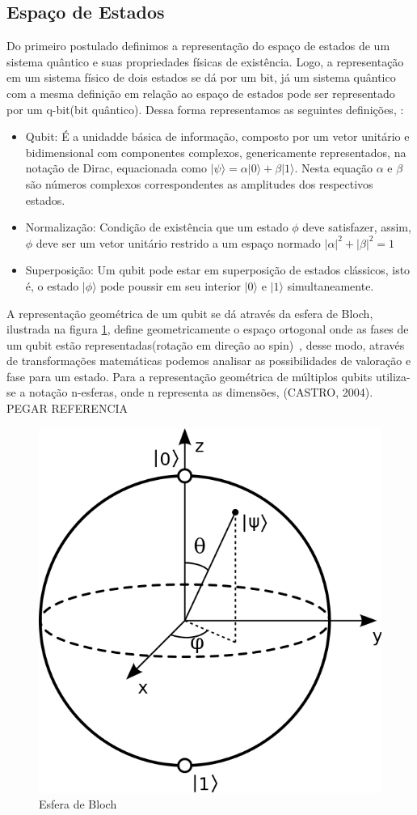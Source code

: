 \documentclass[tcc,capa]{texufpel}
\begin{document}
\subsection{Espaço de Estados}
Do primeiro postulado definimos a representação do espaço de estados de um sistema quântico e suas propriedades físicas de existência. Logo, a representação em um sistema físico de dois estados se dá por um bit, já um sistema quântico com a mesma definição em relação ao espaço de estados pode ser representado por um q-bit(bit quântico).  Dessa forma representamos as seguintes definições\cite{maron:2013:ccgrid}, \cite{Schmalfuss14}:
\begin{itemize}
    \item Qubit: É a unidadde básica de informação, composto por um vetor unitário e bidimensional com componentes complexos, genericamente representados, na notação de Dirac, equacionada como $|\psi\rangle= \alpha|0\rangle + \beta|1\rangle$. Nesta equação $\alpha$ e $\beta$ são números complexos correspondentes as amplitudes dos respectivos estados.
    \item Normalização: Condição de existência que um estado $\phi$ deve satisfazer, assim, $\phi$ deve ser um vetor unitário restrido a um espaço normado $|\alpha|^2 + |\beta|^2=1$ 
    \item Superposição: Um qubit pode estar em superposição de estados clássicos, isto é, o estado $|\phi\rangle$ pode poussir em seu interior $|0\rangle$ e $|1\rangle$ simultaneamente. 
\end{itemize}

A representação geométrica de um qubit se dá através da esfera de Bloch, ilustrada na figura \ref{fig:Bloch}, define geometricamente o espaço ortogonal onde as fases de um qubit estão representadas(rotação em direção ao spin)~\cite{chuang00a}, desse modo, através de transformações matemáticas podemos analisar as possibilidades de valoração e fase para um estado. Para a representação geométrica de múltiplos qubits utiliza-se a notação n-esferas, onde n representa as dimensões, (CASTRO, 2004). PEGAR REFERENCIA


\begin{figure}[ht]
    \centering
    \includegraphics[width=.2\textwidth]{imagens/blochSphere.png}
    \caption{Esfera de Bloch}
    \label{fig:Bloch}
\end{figure}
\end{document}
